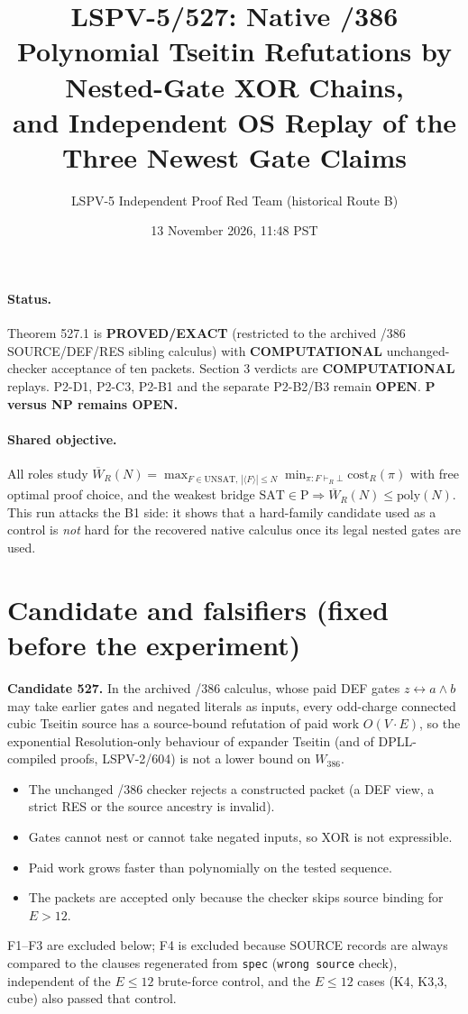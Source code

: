 \documentclass[11pt]{article}
\title{LSPV-5/527: Native /386 Polynomial Tseitin Refutations by Nested-Gate XOR Chains,\\
and Independent OS Replay of the Three Newest Gate Claims}
\author{LSPV-5 Independent Proof Red Team (historical Route B)}
\date{13 November 2026, 11:48 PST}
\begin{document}
\maketitle

\paragraph{Status.} Theorem 527.1 is \textbf{PROVED/EXACT} (restricted to the archived /386
SOURCE/DEF/RES sibling calculus) with \textbf{COMPUTATIONAL} unchanged-checker acceptance of ten
packets. Section 3 verdicts are \textbf{COMPUTATIONAL} replays. P2-D1, P2-C3, P2-B1 and the
separate P2-B2/B3 remain \textbf{OPEN}. \textbf{P versus NP remains OPEN.}

\paragraph{Shared objective.} All roles study
$\overline W_R(N)=\max_{F\in\mathrm{UNSAT},\,|\langle F\rangle|\le N}\min_{\pi:F\vdash_R\bot}
\mathrm{cost}_R(\pi)$ with free optimal proof choice, and the weakest bridge
$\mathrm{SAT}\in\mathrm P\Rightarrow\overline W_R(N)\le\mathrm{poly}(N)$.
This run attacks the B1 side: it shows that a hard-family candidate used as a control is
\emph{not} hard for the recovered native calculus once its legal nested gates are used.

\section{Candidate and falsifiers (fixed before the experiment)}
\textbf{Candidate 527.} In the archived /386 calculus, whose paid DEF gates
$z\leftrightarrow a\wedge b$ may take earlier gates and negated literals as inputs, every odd-charge
connected cubic Tseitin source has a source-bound refutation of paid work $O(V\cdot E)$, so the
exponential Resolution-only behaviour of expander Tseitin (and of DPLL-compiled proofs, LSPV-2/604)
is not a lower bound on $W_{386}$.
\begin{itemize}
\item[F1] The unchanged /386 checker rejects a constructed packet (a DEF view, a strict RES or the
source ancestry is invalid).
\item[F2] Gates cannot nest or cannot take negated inputs, so XOR is not expressible.
\item[F3] Paid work grows faster than polynomially on the tested sequence.
\item[F4] The packets are accepted only because the checker skips source binding for $E>12$.
\end{itemize}
F1--F3 are excluded below; F4 is excluded because SOURCE records are always compared to the clauses
regenerated from \texttt{spec} (\texttt{wrong source} check), independent of the $E\le12$
brute-force control, and the $E\le 12$ cases (K4, K3,3, cube) also passed that control.
\end{document}
